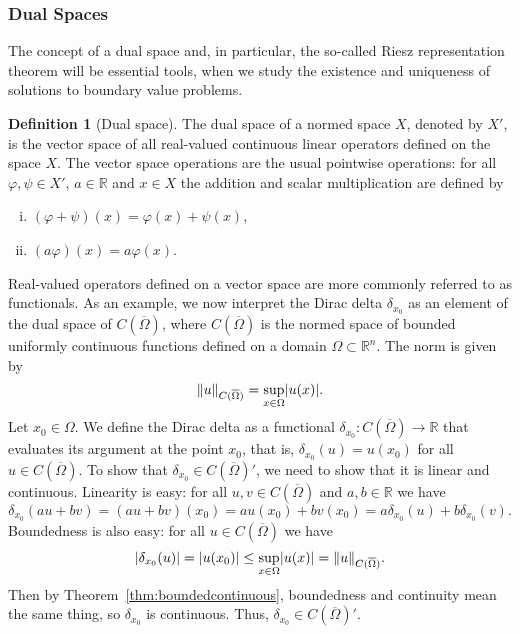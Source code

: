\documentclass[english, 12pt, a4paper, sci, utf8, a-2b, online]{aaltothesis}
\theoremstyle{definition}
\newtheorem{definition}{Definition}[section]
\theoremstyle{plain}
\DeclarePairedDelimiter\abs{\lvert}{\rvert}
\DeclarePairedDelimiter\norm{\lVert}{\rVert}
\numberwithin{equation}{section}
\begin{document}
\subsubsection{Dual Spaces}
\label{subsubsec:dualspaces}

The concept of a dual space and, in particular, the so-called Riesz representation 
theorem will be essential tools,
when we study the existence and uniqueness of solutions to boundary value problems.
\begin{definition}[Dual space]
    \label{def:dualspace}
    The dual space of a normed space $X$, denoted by $X'$,
    is the vector space of all real-valued continuous linear operators defined on the space $X$. The vector space operations are the usual pointwise operations:
    for all $\varphi, \psi \in X'$, $a \in \mathbb{R}$ and $x \in X$
    the addition and scalar multiplication are defined by
    \begin{enumerate}[(i)]
        \item $(\varphi + \psi)(x) = \varphi(x) + \psi(x)$,
        \item $(a \varphi)(x) = a \varphi(x)$.
    \end{enumerate}
\end{definition}
Real-valued operators defined on a vector space are more commonly referred to
as functionals. As an example, we now interpret the Dirac delta $\delta_{x_0}$ 
as an element of the dual space of $C(\overline{\Omega})$, where
$C(\overline{\Omega})$ is the normed space of bounded uniformly continuous 
functions defined on a domain $\Omega \subset \mathbb{R}^n$.
The norm is given by
\begin{equation*}
    \norm{u}_{C(\overline{\Omega})} = \sup_{x \in \Omega} \abs{u(x)}.
\end{equation*}
Let $x_0 \in \Omega$. We define the Dirac delta as a functional
$\delta_{x_0}: C(\overline{\Omega}) \to \mathbb{R}$ that evaluates its argument
at the point $x_0$, that is, $\delta_{x_0}(u) = u(x_0)$ for all
$u \in C(\overline{\Omega})$.
To show that $\delta_{x_0} \in C(\overline{\Omega})'$,
we need to show that it is linear and continuous.
Linearity is easy: for all $u,v \in C(\overline{\Omega})$
and $a,b \in \mathbb{R}$ we have
\begin{equation*}
    \delta_{x_0}(au+bv)
    = (au+bv)(x_0)
    = au(x_0)+bv(x_0)
    = a \delta_{x_0}(u) + b \delta_{x_0}(v).
\end{equation*}
Boundedness is also easy: for all $u \in C(\overline{\Omega})$ we have
\begin{equation*}
    \abs{\delta_{x_0}(u)}
    = \abs{u(x_0)}
    \leq \sup_{x \in \Omega} \abs{u(x)}
    = \norm{u}_{C(\overline{\Omega})}.
\end{equation*}
Then by Theorem~\ref{thm:boundedcontinuous}, boundedness and continuity
mean the same thing, so $\delta_{x_0}$ is continuous.
Thus, $\delta_{x_0} \in C(\overline{\Omega})'$.
\end{document}
